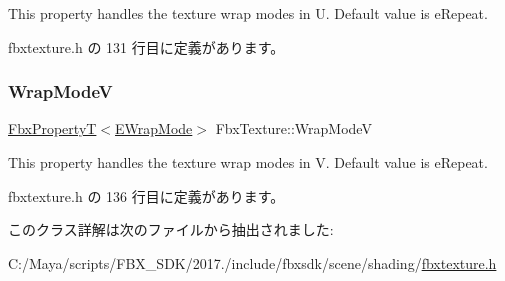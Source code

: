 This property handles the texture wrap modes in U. Default value is e\+Repeat. 

 fbxtexture.\+h の 131 行目に定義があります。

\mbox{\label{class_fbx_texture_ae829c86b14a0bf8168d4997f5fd729ce}} 
\subsubsection{\texorpdfstring{Wrap\+ModeV}{WrapModeV}}
{\footnotesize\ttfamily \hyperlink{class_fbx_property_t}{Fbx\+PropertyT}$<$\hyperlink{class_fbx_texture_ae273dffe3ff532dfd57e7bdb15b121fd}{E\+Wrap\+Mode}$>$ Fbx\+Texture\+::\+Wrap\+ModeV}

This property handles the texture wrap modes in V. Default value is e\+Repeat. 

 fbxtexture.\+h の 136 行目に定義があります。



このクラス詳解は次のファイルから抽出されました\+:\begin{DoxyCompactItemize}
\item 
C\+:/\+Maya/scripts/\+F\+B\+X\+\_\+\+S\+D\+K/2017./include/fbxsdk/scene/shading/\hyperlink{fbxtexture_8h}{fbxtexture.\+h}\end{DoxyCompactItemize}
